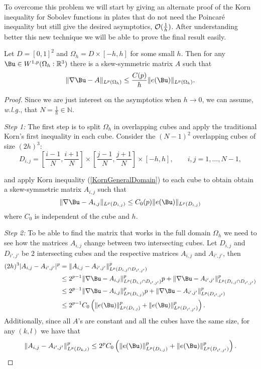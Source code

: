 To overcome this problem we will start by giving an alternate proof of the Korn inequality for Sobolev functions in plates that do not need the Poincaré inequality but still give the desired asymptotics, ${\mathcal O}(\frac{1}{h})$. After understanding better this new technique we will be able to prove the final result easily.

\begin{theorem} Let $D=[0,1]^2$ and $\Omega_h = D\times[-h,h]$ for some small $h$. Then for any   $\Bu\in W^{1,p}(\Omega_h:\R^3)$ there is  a skew-symmetric matrix $A$ such that
$$\|\nabla \Bu - A\|_{L^p(\Omega_h)}\leq \frac{C(p)}{h}\|e(\Bu)\|_{L^p(\Omega_h)}.$$
\end{theorem}
\begin{proof}
Since we are just interest on the asymptotics when $h\to 0$, we can assume, \textit{w.l.g.}, that $N=\frac{1}{h}\in\mathbb{N}$. 

\textit{Step 1:} The first step is to split $\Omega_h$ in overlapping cubes and apply the traditional Korn's first inequality in each cube. Consider the $(N-1)^2$ overlapping cubes of size $(2h)^3$:
$$D_{i,j}=\left[\frac{i-1}{N},\frac{i+1}{N}\right]\times\left[\frac{j-1}{N},\frac{j+1}{N}\right]\times[-h,h],\qquad i,j=1,\ldots,N-1,$$

and apply  Korn inequality (\ref{KornGeneralDomain}) to each cube to obtain obtain a skew-symmetric matrix $A_{i,j}$ such that 
    \begin{equation}\label{kornkjSobolev}
    \|\nabla \Bu- A_{i,j}\|_{L^p(D_{i,j})} \leq C_0(p) \|e(\Bu)\|_{L^p(D_{i,j})}
    \end{equation}
where $C_0$ is independent of the cube and $h$.

\textit{Step 2:} To be able to find the matrix that works in the full domain $\Omega_h$ we need to see how the matrices $A_{i,j}$ change between two intersecting cubes. Let  $D_{i,j}$ and $D_{i',j'}$ be 2 intersecting cubes and the respective matrices $A_{i,j}$ and $A_{i',j'}$, then
\begin{align*}
    (2h)^3|A_{i,j}-A_{i',j'}|^p & = \|A_{i,j}-A_{i',j'}\|^p_{L^p({D_{i,j}\cap D_{i',j'}})}\\
    &\leq 2^{p-1}\|\nabla \Bu-A_{i,j}\|^p_{L^p({D_{i,j}\cap D_{i',j'}})}p + \|\nabla \Bu-A_{i',j'}\|^p_{L^p({D_{i,j}\cap D_{i',j'}})}\\
    &\leq 2^{p-1}\|\nabla \Bu-A_{i,j}\|^p_{L^p(D_{i,j})}p + \|\nabla \Bu-A_{i',j'}\|^p_{L^p(D_{i',j'})}\\
    &\leq 2^{p-1}C_0 \left(\|e(\Bu)\|^p_{L^p(D_{i,j})}+\|e(\Bu)\|^p_{L^p(D_{i',j'})}\right).
\end{align*}
Additionally, since all $A$'s are constant and all the cubes have the same size, for any $(k,l)$ we have that
\begin{equation}\label{interCubes}
    \|A_{i,j}-A_{i',j'}\|^p_{L^p(D_{k,l})}\leq 2^p C_0 \left(\|e(\Bu)\|^p_{L^p(D_{i,j})}+\|e(\Bu)\|^p_{L^p(D_{i',j'})}\right).
\end{equation}


\end{proof}
